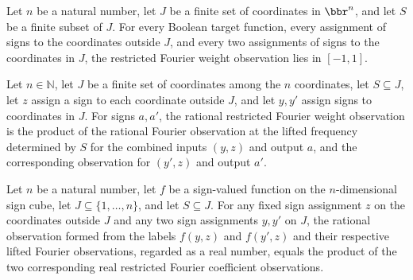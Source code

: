 \begin{theorem}
\label{FABL.restrictedFourierWeightObservation_mem_Icc}
\leanok
{}
Let $n$ be a natural number, let $J$ be a finite set of coordinates in $\bbr^n$, and let
$S$ be a finite subset of $J$. For every Boolean target function, every assignment of
signs to the coordinates outside $J$, and every two assignments of signs to the
coordinates in $J$, the restricted Fourier weight observation lies in $[-1,1]$.
\end{theorem}

\begin{definition}
\label{FABL.rationalRestrictedFourierWeightObservation}
\leanok
{}
Let $n\in\mathbb N$, let $J$ be a finite set of coordinates among the $n$ coordinates,
let $S\subseteq J$, let $z$ assign a sign to each coordinate outside $J$, and let $y,y'$
assign signs to coordinates in $J$. For signs $a,a'$, the rational restricted Fourier
weight observation is the product of the rational Fourier observation at the lifted
frequency determined by $S$ for the combined inputs $(y,z)$ and output $a$, and the
corresponding observation for $(y',z)$ and output $a'$.
\end{definition}

\begin{theorem}
\label{FABL.rationalRestrictedFourierWeightObservation_cast}
\leanok
{}
Let $n$ be a natural number, let $f$ be a sign-valued function on the $n$-dimensional
sign cube, let $J\subseteq\{1,\ldots,n\}$, and let $S\subseteq J$. For any fixed sign
assignment $z$ on the coordinates outside $J$ and any two sign assignments $y,y'$ on
$J$, the rational observation formed from the labels $f(y,z)$ and $f(y',z)$ and their
respective lifted Fourier observations, regarded as a real number, equals the product of
the two corresponding real restricted Fourier coefficient observations.
\end{theorem}

